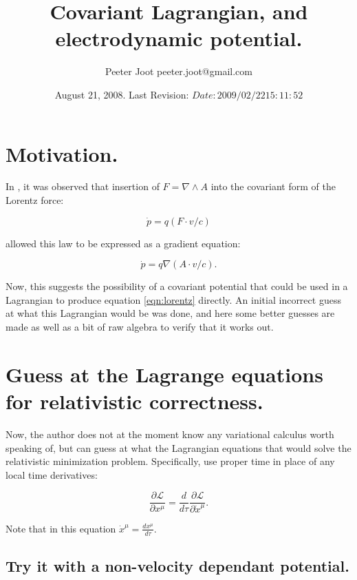 \documentclass{article}
\title{ Covariant Lagrangian, and electrodynamic potential. }
\author{Peeter Joot \quad peeter.joot@gmail.com}
\date{August 21, 2008.  Last Revision: $Date: 2009/02/22 15:11:52 $}
\newcommand{\grad}[0] {\nabla}
\newcommand{\pdot}[0]{\dot{p}}
\newcommand{\xdot}[0]{\dot{x}}
\begin{document}
\maketitle{}

\tableofcontents

\section{ Motivation. }

In \cite{PJSrGAFPLorentzForce}, it was observed that insertion of $F = \grad \wedge A$ into
the covariant form of the Lorentz force:

\begin{equation}\label{eqn:lorentz}
\pdot = q (F \cdot v/c)
\end{equation}

allowed this law to be expressed as a gradient equation:

\begin{equation}
\pdot = q \grad (A \cdot v/c).
\end{equation}

Now, this suggests the possibility of a covariant potential that could be 
used in a Lagrangian to produce equation \ref{eqn:lorentz} directly.  An
initial incorrect guess at what this Lagrangian would be was done, and
here some better guesses are made as well as a bit of raw algebra to verify
that it works out.

\section{ Guess at the Lagrange equations for relativistic correctness. }

Now, the author does not at the moment know any variational calculus worth
speaking of, but can guess at what the Lagrangian equations that would 
solve the relativistic minimization problem.  Specifically, use proper
time in place of any local time derivatives:

\begin{equation}\label{eqn:properLagrange}
\frac{\partial \mathcal{L}}{\partial x^{\mu}} = 
\frac{d}{d\tau} \frac{\partial \mathcal{L}}{\partial \xdot^{\mu}}.
\end{equation}

Note that in this equation $\xdot^{\mu} = \frac{d x^{\mu}}{d\tau}$.

\subsection{ Try it with a non-velocity dependant potential. }
\end{document}

